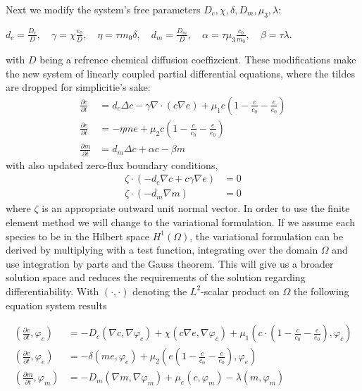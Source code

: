 Next we modify the system's free parameters $D_c, \chi, \delta, D_m, \mu_3, \lambda$:  
\begin{center}
    $d_c = \frac{D_c}{D},\quad \gamma = \chi \frac{e_0}{D},\quad \eta = \tau m_0 \delta,\quad d_m = \frac{D_m}{D},\quad \alpha = \tau \mu_3 \frac{c_0}{m_0},\quad \beta = \tau \lambda$.
\end{center} 
with $D$ being a refrence chemical diffusion coeffizcient.\newline 
These modifications make the new system of linearly coupled partial differential equations, where the tildes are dropped for simplicitie's sake:
\begin{align}
	\frac{\partial c}{\partial t} &= d_c \Delta c - \gamma \nabla \cdot (c\nabla e)  + \mu_1 c\left(1-\frac{c}{c_0}-\frac{e}{e_0}\right)\label{eq:6}\\
	\frac{\partial e}{\partial t} &= -\eta m e  + \mu_2 c\left(1-\frac{c}{c_0}-\frac{e}{e_0}\right)\label{eq:7}\\
	\frac{\partial m}{\partial t} &= d_m \Delta c + \alpha c - \beta m\label{eq:8}
\end{align}
with also updated zero-flux boundary conditions, 
\begin{align}
	\zeta \cdot (-d_c \nabla c + c \gamma \nabla e) &= 0\label{eq:9}\\
	\zeta \cdot (-d_m\nabla m ) &= 0\label{eq:10}
\end{align}
where $\zeta$ is an appropriate outward unit normal vector.\newline 
In order to use the finite element method we will change to the variational formulation. If we assume each species to be in the Hilbert space $H^1(\Omega)$, the variational formulation can be derived by multiplying with a test function, integrating over the domain $\Omega$ and use integration by parts and the Gauss theorem. This will give us a broader solution space and reduces the requirements of the solution regarding differentiability. With $\left(\cdot, \cdot\right)$ denoting the $L^2$-scalar product on $\Omega$ the following equation system results

\begin{align}
    \left(\frac{\partial c}{\partial t}, \varphi_c\right) &=
        - D_c\left(\nabla c, \nabla \varphi_c\right) + \chi \left(c\nabla e, \nabla \varphi_c\right) + \mu_1 \left(c \cdot \left(1-\frac{c}{c_0} - \frac{e}{e_0}\right), \varphi_c\right) \label{eq:11}\\
    \left(\frac{\partial e}{\partial t}, \varphi_e\right) &=  -\delta \left( me, \varphi_e\right) + \mu_2 \left(e\left(1-\frac{c}{c_0}-\frac{e}{e_0}\right),\varphi_e\right) \label{eq:12}\\
    \left(\frac{\partial m}{\partial t}, \varphi_m\right) &= -D_m \left(\nabla m,\nabla \varphi_m\right) + \mu_e \left(c,\varphi_m\right) - \lambda \left(m,\varphi_m\right) \label{eq:13}
\end{align}

